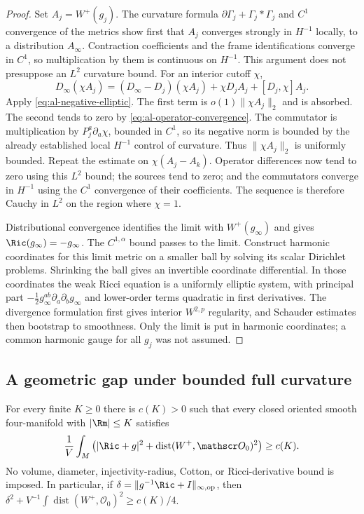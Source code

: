 \begin{proof}
Set $A_j=W^+(g_j)$.  The curvature formula
$\partial\Gamma_j+\Gamma_j*\Gamma_j$ and $C^1$ convergence of the
metrics show first that $A_j$ converges strongly in $H^{-1}$ locally,
to a distribution $A_\infty$.  Contraction coefficients and the frame
identifications converge in $C^1$, so multiplication by them is continuous
on $H^{-1}$.  This argument does not presuppose an $L^2$ curvature bound.
For an interior cutoff $\chi$,
\[
 D_\infty(\chi A_j)
 =(D_\infty-D_j)(\chi A_j)+\chi D_jA_j+[D_j,\chi]A_j.
\]
Apply \eqref{eq:al-negative-elliptic}.  The first term is
$o(1)\|\chi A_j\|_2$ and is absorbed.  The second tends to zero by
\eqref{eq:al-operator-convergence}.  The commutator is multiplication by
$P_j^a\partial_a\chi$, bounded in $C^1$, so its negative norm is bounded
by the already established local $H^{-1}$ control of curvature.
Thus $\|\chi A_j\|_2$ is uniformly bounded.  Repeat the estimate on
$\chi(A_j-A_k)$.  Operator differences now tend to zero using this
$L^2$ bound; the sources tend to zero; and the commutators converge in
$H^{-1}$ using the $C^1$ convergence of their coefficients.  The sequence
is therefore Cauchy in $L^2$ on the region where $\chi=1$.

Distributional convergence identifies the limit with $W^+(g_\infty)$
and gives $\Ric(g_\infty)=-g_\infty$.  The $C^{1,\alpha}$ bound passes
to the limit.  Construct harmonic coordinates for this limit metric on
a smaller ball by solving its scalar Dirichlet problems.  Shrinking the
ball gives an invertible coordinate differential.  In those coordinates
the weak Ricci equation is a uniformly elliptic system, with principal
part $-\tfrac12g_\infty^{ab}\partial_a\partial_b g_\infty$ and lower-order
terms quadratic in first derivatives.  The divergence formulation first
gives interior $W^{2,p}$ regularity, and Schauder estimates then bootstrap
to smoothness.  Only the limit is put in harmonic coordinates; a common
harmonic gauge for all $g_j$ was not assumed.
\end{proof}

\subsection{A geometric gap under bounded full curvature}

\begin{theorem}
\label{thm:al-bounded-curvature-gap}
For every finite $K\ge0$ there is $c(K)>0$ such that every closed oriented
smooth four-manifold with $|\Rm|\le K$ satisfies
\begin{equation}\label{eq:al-bounded-curvature-gap}
 \frac1V\int_M\left(|\Ric+g|^2+
                     \operatorname{dist}(W^+,\mathscr O_0)^2\right)
 \ge c(K).
\end{equation}
No volume, diameter, injectivity-radius, Cotton, or Ricci-derivative bound
is imposed.  In particular, if
$\delta=\|g^{-1}\Ric+I\|_{\infty,\mathrm{op}}$, then
$\delta^2+V^{-1}\int\operatorname{dist}(W^+,\mathscr O_0)^2\ge c(K)/4$.
\end{theorem}

